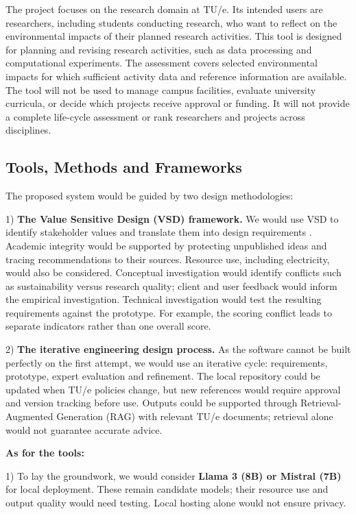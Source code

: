 \documentclass[11pt,a4paper]{article}
\begin{document}
The project focuses on the research domain at TU/e. Its intended users are researchers, including students conducting research, who want to reflect on the environmental impacts of their planned research activities. This tool is designed for planning and revising research activities, such as data processing and computational experiments. The assessment covers selected environmental impacts for which sufficient activity data and reference information are available.
The tool will not be used to manage campus facilities, evaluate university curricula, or decide which projects receive approval or funding. It will not provide a complete life-cycle assessment or rank researchers and projects across disciplines.

\subsection{Tools, Methods and Frameworks}
The proposed system would be guided by two design methodologies:

1) \textbf{The Value Sensitive Design (VSD) framework.} We would use VSD to identify stakeholder values and translate them into design requirements \citep{friedman2019shaping,vsdlab}. Academic integrity would be supported by protecting unpublished ideas and tracing recommendations to their sources. Resource use, including electricity, would also be considered. Conceptual investigation would identify conflicts such as sustainability versus research quality; client and user feedback would inform the empirical investigation. Technical investigation would test the resulting requirements against the prototype. For example, the scoring conflict leads to separate indicators rather than one overall score.

2) \textbf{The iterative engineering design process.} As the software cannot be built perfectly on the first attempt, we would use an iterative cycle: requirements, prototype, expert evaluation and refinement. The local repository could be updated when TU/e policies change, but new references would require approval and version tracking before use. Outputs could be supported through Retrieval-Augmented Generation (RAG) with relevant TU/e documents; retrieval alone would not guarantee accurate advice.

\textbf{As for the tools:}

1) To lay the groundwork, we would consider \textbf{Llama 3 (8B) or Mistral (7B)} for local deployment. These remain candidate models; their resource use and output quality would need testing. Local hosting alone would not ensure privacy.
\end{document}

